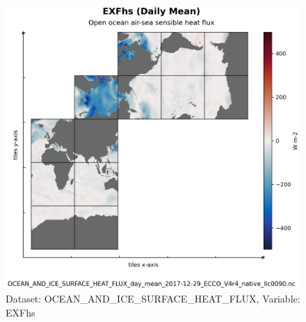 \begin{figure}[H]
\centering
\includegraphics[scale=0.55]{../images/plots/native_plots/Ocean_and_Sea-Ice_Surface_Heat_Fluxes/EXFhs.png}
\caption{Dataset: OCEAN\_AND\_ICE\_SURFACE\_HEAT\_FLUX, Variable: EXFhs}
\label{tab:table-OCEAN_AND_ICE_SURFACE_HEAT_FLUX_EXFhs-Plot}
\end{figure}
\pagebreak
